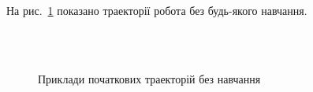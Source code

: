 На рис.~\ref{fig:bad-moves-samples} показано траекторії робота без будь-якого навчання.
\begin{figure}
  \centering
  \,
   \\
  \,
  \caption{Приклади початкових траекторій без навчання}
  \label{fig:bad-moves-samples}
\end{figure}

